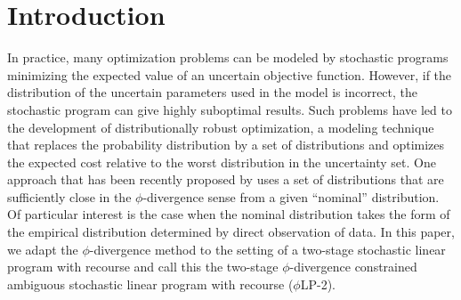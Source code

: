 \documentclass[opre,nonblindrev]{informs3} %
\newcommand{\plp}{$\phi$LP-2}
\begin{document}
%

\section{Introduction}

In practice, many optimization problems can be modeled by stochastic programs minimizing the expected value of an uncertain objective function.
However, if the distribution of the uncertain parameters used in the model is incorrect, the stochastic program can give highly suboptimal results.
Such problems have led to the development of distributionally robust optimization, a modeling technique that replaces the probability distribution by a set of distributions and optimizes the expected cost relative to the worst distribution in the uncertainty set.
One approach that has been recently proposed by \citet{bental2011robust} uses a set of distributions that are sufficiently close in the $\phi$-divergence sense from a given ``nominal'' distribution. 
Of particular interest is the case when the nominal distribution takes the form of the empirical distribution determined by direct observation of data.
In this paper, we adapt the $\phi$-divergence method to the setting of a two-stage stochastic linear program with recourse and call this the two-stage $\phi$-divergence constrained ambiguous stochastic linear program with recourse (\plp).
\end{document}
